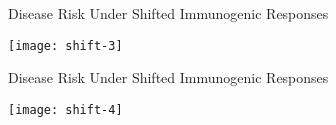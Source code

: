 \documentclass{beamer}
\begin{document}
\begin{frame}[c]{Disease Risk Under Shifted Immunogenic Responses}

\hspace*{-1cm}\texttt{[image: shift-3]}

\note{
}

\end{frame}


\begin{frame}[c]{Disease Risk Under Shifted Immunogenic Responses}

\hspace*{-1cm}\texttt{[image: shift-4]}

\note{
}

\end{frame}

\end{document}
